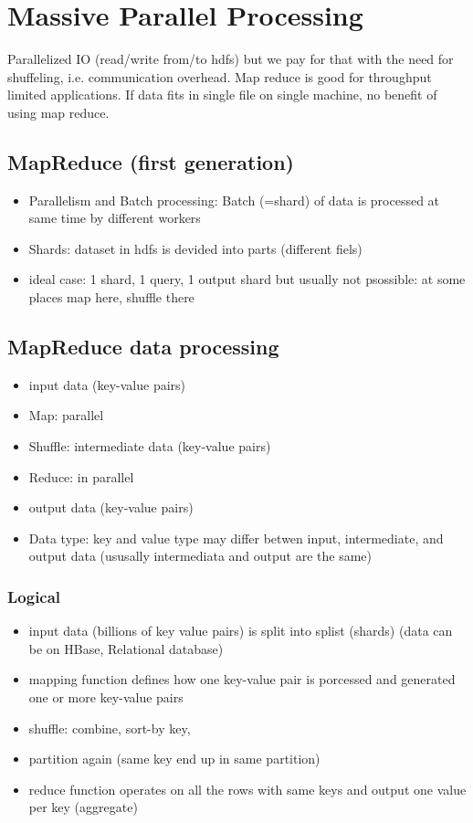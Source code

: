 \section{Massive Parallel Processing}
Parallelized IO (read/write from/to hdfs) but we pay for that with
the need for shuffeling, i.e. communication overhead.
Map reduce is good for throughput limited applications.
If data fits in single file on single machine, no benefit of using map reduce.

\subsection{MapReduce (first generation)}
\begin{itemize}
    \item Parallelism and Batch processing: Batch (=shard) of data is processed at same time by different workers
    \item Shards: dataset in hdfs is devided into parts (different fiels)
    \item ideal case: 1 shard, 1 query, 1 output shard but usually not psossible: at some places map here, shuffle there
\end{itemize}

\subsection{MapReduce data processing}
\begin{itemize}
    \item input data (key-value pairs)
    \item Map: parallel
    \item Shuffle: intermediate data (key-value pairs)
    \item Reduce: in parallel
    \item output data (key-value pairs)
    \item Data type: key and value type may differ betwen input, intermediate, and output data (ususally intermediata and output are the same)

\end{itemize}
\subsubsection{Logical}
\begin{itemize}
    \item input data (billions of key value pairs) is split into splist (shards) 
    (data can be on HBase, Relational database)
    \item mapping function defines how one key-value pair is porcessed and generated one or more key-value pairs
    \item shuffle: combine, sort-by key,
    \item partition again (same key end up in same partition)
    \item reduce function operates on all the rows with same keys and output one value per key (aggregate)
\end{itemize}

